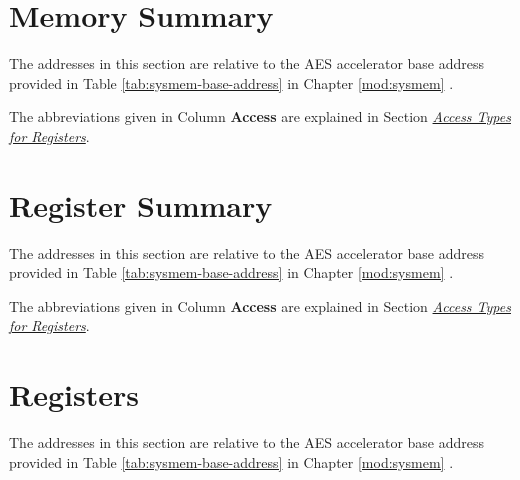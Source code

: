 \documentclass[main\_\_EN.tex]{subfiles}
\begin{document}
\section{Memory Summary}\label{aesMemorySummary}

The addresses in this section are relative to the AES accelerator base address provided in Table \ref{tab:sysmem-base-address} in Chapter \ref{mod:sysmem} \textit{}.

The abbreviations given in Column \textbf{Access} are explained in Section \hyperref[glossary-access-types]{\textit{Access Types for Registers}}.




\clearpage

\hypertarget{aes-reg-summ}{}
\section{Register Summary}

The addresses in this section are relative to the AES accelerator base address provided in Table \ref{tab:sysmem-base-address} in Chapter \ref{mod:sysmem} \textit{}.

The abbreviations given in Column \textbf{Access} are explained in Section \hyperref[glossary-access-types]{\textit{Access Types for Registers}}.


\clearpage
\section{Registers}
The addresses in this section are relative to the AES accelerator base address provided in Table \ref{tab:sysmem-base-address} in Chapter \ref{mod:sysmem} \textit{}.


\end{document}

